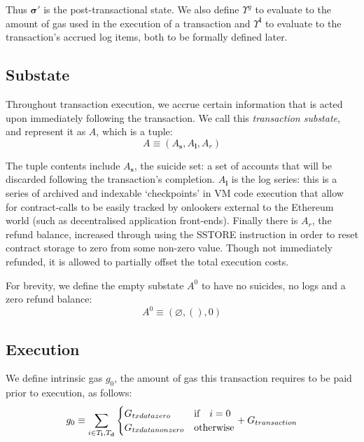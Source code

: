 \documentclass[9pt,oneside]{amsart}
\begin{document}
\begin{multicols}{2}
Thus $\boldsymbol{\sigma}'$ is the post-transactional state. We also define $\Upsilon^g$ to evaluate to the amount of gas used in the execution of a transaction and $\Upsilon^\mathbf{l}$ to evaluate to the transaction's accrued log items, both to be formally defined later.

\subsection{Substate}
Throughout transaction execution, we accrue certain information that is acted upon immediately following the transaction. We call this \textit{transaction substate}, and represent it as $A$, which is a tuple:
\begin{equation}
A \equiv (A_\mathbf{s}, A_\mathbf{l}, A_r)
\end{equation}

The tuple contents include $A_\mathbf{s}$, the suicide set: a set of accounts that will be discarded following the transaction's completion. $A_\mathbf{l}$ is the log series: this is a series of archived and indexable `checkpoints' in VM code execution that allow for contract-calls to be easily tracked by onlookers external to the Ethereum world (such as decentralised application front-ends). Finally there is $A_r$, the refund balance, increased through using the {\small SSTORE} instruction in order to reset contract storage to zero from some non-zero value. Though not immediately refunded, it is allowed to partially offset the total execution costs.

For brevity, we define the empty substate $A^0$ to have no suicides, no logs and a zero refund balance:
\begin{equation}
A^0 \equiv (\varnothing, (), 0)
\end{equation}

\subsection{Execution}
We define intrinsic gas $g_0$, the amount of gas this transaction requires to be paid prior to execution, as follows:
\begin{equation}
g_0 \equiv \sum_{i \in T_\mathbf{i}, T_\mathbf{d}} \begin{cases} G_{txdatazero} & \text{if} \quad i = 0 \\ G_{txdatanonzero} & \text{otherwise} \end{cases} + G_{transaction}\\
\end{equation}


\end{multicols}
\end{document}
